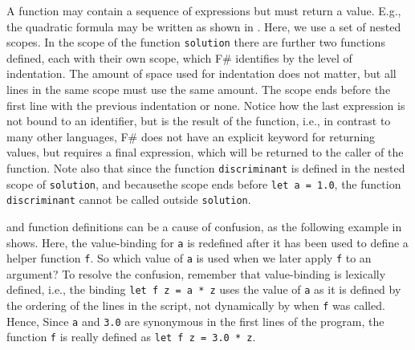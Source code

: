 \documentclass[fsharpNotes.tex]{subfiles}
\begin{document}
A function may contain a sequence of expressions but must return a value. E.g., the quadratic formula may be written as shown in . 
%
%
Here, we use a set of nested scopes. In the scope of the function \lstinline{solution} there are further two functions defined, each with their own scope, which F\# identifies by the level of indentation. The amount of space used for indentation does not matter, but all lines in the same scope must use the same amount. The scope ends before the first line with the previous indentation or none. Notice how the last expression is not bound to an identifier, but is the result of the function, i.e., in contrast to many other languages, F\# does not have an explicit keyword for returning values, but requires a final expression, which will be returned to the caller of the function. Note also that since the function \lstinline!discriminant! is defined in the nested scope of \lstinline!solution!, and becausethe scope ends before \lstinline!let a = 1.0!, the function \lstinline!discriminant! cannot be called outside \lstinline!solution!.

 and function definitions can be a cause of confusion, as the following example in  shows.
%
%
Here, the value-binding for \lstinline!a! is redefined after it has been used to define a helper function \lstinline!f!. So which value of \lstinline!a! is used when we later apply \lstinline!f! to an argument? To resolve the confusion, remember that value-binding is lexically defined, i.e., the binding \lstinline!let f z = a * z! uses the value of \lstinline!a! as it is defined by the ordering of the lines in the script, not dynamically by when \lstinline!f! was called. Hence,  Since \lstinline!a! and \lstinline!3.0! are synonymous in the first lines of the program, the function \lstinline!f! is really defined as \lstinline!let f z = 3.0 * z!.
\end{document}
